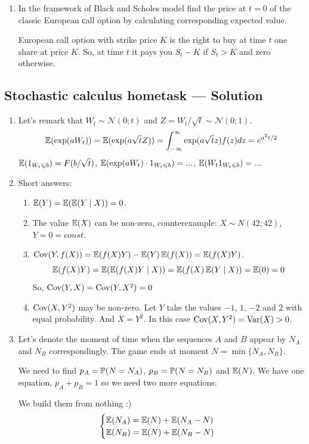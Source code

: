 \documentclass[12pt, a4paper]{article}
\newcommand{\cN}{\mathcal{N}}
\begin{document}
\begin{enumerate}
\item In the framework of Black and Scholes model find the price at $t=0$ of the classic European сall option by calculating corresponding expected value.

European call option with strike price $K$ is the right to buy at time $t$ one share at price $K$. So, at time $t$ it pays you $S_t - K$ if $S_t > K$ and zero otherwise.

\end{enumerate}




\subsection{Stochastic calculus hometask — Solution}

\begin{enumerate}

\item Let's remark that $W_t \sim \cN(0;t)$ and $Z=W_t/\sqrt{t} \sim \cN(0;1)$.
\[
\E(\exp(aW_t))=\E(\exp(a\sqrt{t} Z))=
\int_{-\infty}^{\infty}\exp(a\sqrt{t} z)f(z)dz =
e^{a^2t/2}
\]
$\E(1_{W_t\leq b})=F(b/\sqrt{t})$, $\E(\exp(aW_t)\cdot 1_{W_t\leq b})=...$, $\E(W_t 1_{W_t\leq b})=...$
\item Short answers:

\begin{enumerate}
\item $\E(Y)=\E(\E(Y \mid X))=0$.
\item The value $\E(X)$ can be non-zero, counterexample: $X\sim N(42; 42)$, $Y=0=const$.
\item $\Cov(Y, f(X)) = \E(f(X)Y) - \E(Y)\E(f(X))=\E(f(X)Y)$.
\[
\E(f(X)Y)= \E(\E(f(X)Y \mid X))=\E(f(X)\E(Y \mid X))=\E(0)=0
\]
So, $\Cov(Y,X)=\Cov(Y,X^2)=0$
\item $\Cov(X, Y^2)$ may be non-zero. Let $Y$ take the values $-1$, $1$, $-2$ and $2$ with equal probability. And $X=Y^2$. In this case $\Cov(X, Y^2)=\Var(X)>0$.
\end{enumerate}

\item Let's denote the moment of time when the sequences $A$ and $B$ appear by $N_A$ and $N_B$ correspondingly. The game ends at moment $N=\min \{N_A, N_B\}$.

We need to find $p_A = \P(N=N_A)$, $p_B=\P(N=N_B)$ and $\E(N)$. We have one equation, $p_A + p_B = 1$ so we need two more equations:

We build them from nothing :)
\[
\begin{cases}
\E(N_A) = \E(N) + \E(N_A - N) \\
\E(N_B) = \E(N) + \E(N_B - N) \\
\end{cases}
\]


\end{enumerate}
\end{document}

